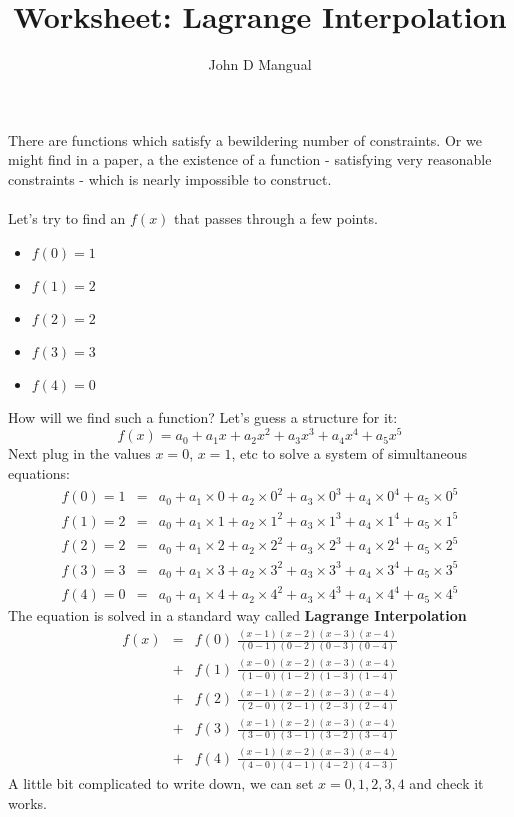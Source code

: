 \documentclass[12pt]{article}
\title{Worksheet: Lagrange Interpolation}
\author{John D Mangual}
\date{}
\begin{document}
\selectfont \fontsize{12.5}{15}\selectfont

\maketitle

\noindent There are functions which satisfy a bewildering number of constraints.  Or we might find in a paper, a the existence of a function - satisfying very reasonable constraints - which is nearly impossible to construct.  \\ \\
Let's try to find an $f(x)$ that passes through a few points.
\begin{itemize}
\item $f(0) = 1$
\item $f(1) = 2$
\item $f(2) = 2$
\item $f(3) = 3$
\item $f(4) = 0$
\end{itemize}
How will we find such a function?  Let's guess a structure for it:
$$ f(x) = a_0 + a_1 x + a_2 x^2 + a_3 x^3 + a_4 x^4 + a_5 x^5 $$
Next plug in the values $x = 0$, $x = 1$, etc to solve a system of simultaneous equations:
\begin{eqnarray*}
f(0) = 1 &=& a_0 + a_1 \times 0 + a_2 \times0^2 + a_3 \times0^3 + a_4\times 0^4 + a_5 \times0^5 \\
f(1) = 2 &=& a_0 + a_1 \times 1 + a_2 \times1^2 + a_3 \times1^3 + a_4\times 1^4 + a_5 \times1^5 \\
f(2) = 2 &=& a_0 + a_1 \times 2 + a_2 \times2^2 + a_3 \times2^3 + a_4\times 2^4 + a_5 \times2^5 \\
f(3) = 3 &=& a_0 + a_1 \times 3 + a_2 \times3^2 + a_3 \times3^3 + a_4\times 3^4 + a_5 \times3^5 \\
f(4) = 0 &=& a_0 + a_1 \times 4 + a_2 \times4^2 + a_3 \times4^3 + a_4\times 4^4 + a_5 \times4^5 
\end{eqnarray*}
The equation is solved in a standard way called \textbf{Lagrange Interpolation}
\begin{eqnarray*} f(x)
 &=& f(0)\; \frac{(x-1)(x-2)(x-3)(x-4)}{(0-1)(0-2)(0-3)(0-4)} \\
 &+& f(1)\; \frac{(x-0)(x-2)(x-3)(x-4)}{(1-0)(1-2)(1-3)(1-4)} \\
 &+& f(2)\; \frac{(x-1)(x-2)(x-3)(x-4)}{(2-0)(2-1)(2-3)(2-4)} \\
 &+& f(3)\; \frac{(x-1)(x-2)(x-3)(x-4)}{(3-0)(3-1)(3-2)(3-4)} \\
 &+& f(4)\; \frac{(x-1)(x-2)(x-3)(x-4)}{(4-0)(4-1)(4-2)(4-3)} 
\end{eqnarray*}
A little bit complicated to write down, we can set $x = 0, 1, 2, 3, 4$ and check it works.
\end{document}
